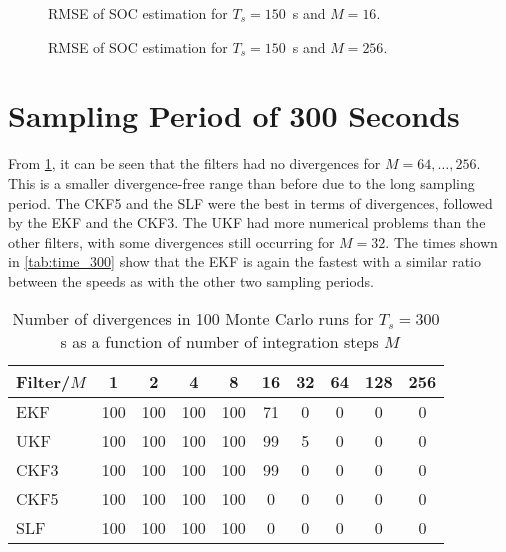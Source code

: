 \documentclass[../zhang_thesis.tex]{subfiles}
\begin{document}
\begin{figure}[h]
\centering
%
\caption{RMSE of SOC estimation for $T_s=150$~s and $M=16$.}
\label{fig:rmse_150_16}
\end{figure}

\begin{figure}
\centering
%
\caption{RMSE of SOC estimation for $T_s=150$~s and $M=256$.}
\label{fig:rmse_150_256}
\end{figure}

\clearpage

\section{Sampling Period of 300 Seconds}

From \cref{tab:div_300}, it can be seen that the filters had no divergences for $M=64,\dots,256$. This is a smaller divergence-free range than before due to the long sampling period. The CKF5 and the SLF were the best in terms of divergences, followed by the EKF and the CKF3. The UKF had more numerical problems than the other filters, with some divergences still occurring for $M=32$. The times shown in \cref{tab:time_300} show that the EKF is again the fastest with a similar ratio between the speeds as with the other two sampling periods. 

\begin{table}[h]
\centering
\caption{Number of divergences in 100 Monte Carlo runs for $T_s=300$~s as a function of number of integration steps $M$}
\begin{tabular}{@{}l*{9}{c}@{}}
\toprule
Filter/$M$ & 1   & 2   & 4   & 8   & 16  & 32 & 64 & 128 & 256 \\
\midrule
EKF        & 100 & 100 & 100 & 100 & 71  & 0  & 0  & 0   & 0   \\
UKF        & 100 & 100 & 100 & 100 & 99  & 5  & 0  & 0   & 0   \\
CKF3       & 100 & 100 & 100 & 100 & 99  & 0  & 0  & 0   & 0   \\
CKF5       & 100 & 100 & 100 & 100 & 0   & 0  & 0  & 0   & 0   \\
SLF        & 100 & 100 & 100 & 100 & 0   & 0  & 0  & 0   & 0   \\
\bottomrule
\end{tabular}
\label{tab:div_300}
\end{table}
\end{document}
